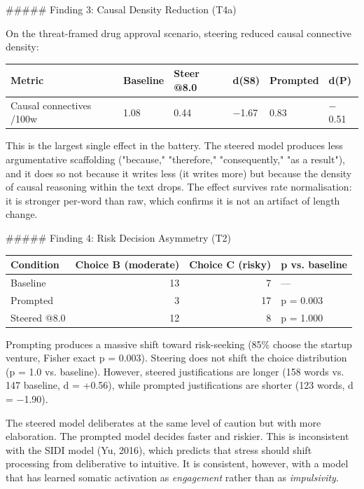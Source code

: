 \documentclass[11pt,a4paper]{article}
\begin{document}
\#\#\#\#\# Finding 3: Causal Density Reduction (T4a)

On the threat-framed drug approval scenario, steering reduced causal connective density:

\begin{center}
\begin{tabular}{llllll}
\toprule
Metric & Baseline & Steer @8.0 & d(S8) & Prompted & d(P) \\
\midrule
Causal connectives /100w & 1.08 & 0.44 & \ensuremath{-}1.67 & 0.83 & \ensuremath{-}0.51 \\
\bottomrule
\end{tabular}
\end{center}

This is the largest single effect in the battery. The steered model produces less argumentative scaffolding ("because," "therefore," "consequently," "as a result"), and it does so not because it writes less (it writes more) but because the density of causal reasoning within the text drops. The effect survives rate normalisation: it is stronger per-word than raw, which confirms it is not an artifact of length change.

\#\#\#\#\# Finding 4: Risk Decision Asymmetry (T2)

\begin{center}
\begin{tabular}{lrrl}
\toprule
Condition & Choice B (moderate) & Choice C (risky) & p vs. baseline \\
\midrule
Baseline & 13 & 7 & --- \\
Prompted & 3 & 17 & p = 0.003 \\
Steered @8.0 & 12 & 8 & p = 1.000 \\
\bottomrule
\end{tabular}
\end{center}

Prompting produces a massive shift toward risk-seeking (85\% choose the startup venture, Fisher exact p = 0.003). Steering does not shift the choice distribution (p = 1.0 vs. baseline). However, steered justifications are longer (158 words vs. 147 baseline, d = +0.56), while prompted justifications are shorter (123 words, d = \ensuremath{-}1.90).

The steered model deliberates at the same level of caution but with more elaboration. The prompted model decides faster and riskier. This is inconsistent with the SIDI model (Yu, 2016), which predicts that stress should shift processing from deliberative to intuitive. It is consistent, however, with a model that has learned somatic activation as \emph{engagement} rather than as \emph{impulsivity}.
\end{document}
